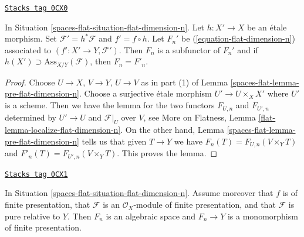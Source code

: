 \begin{lemma}
\label{spaces-flat-lemma-localize-flat-dimension-n}
\href{https://stacks.math.columbia.edu/tag/0CX0}{\texttt{Stacks tag 0CX0}}

In Situation \ref{spaces-flat-situation-flat-dimension-n}.
Let $h : X' \to X$ be an \'etale morphism.
Set $\mathcal{F}' = h^*\mathcal{F}$ and $f' = f \circ h$.
Let $F_n'$ be (\ref{equation-flat-dimension-n})
associated to $(f' : X' \to Y, \mathcal{F}')$.
Then $F_n$ is a subfunctor of $F_n'$ and if
$h(X') \supset \text{Ass}_{X/Y}(\mathcal{F})$, then $F_n = F'_n$.
\end{lemma}

\begin{proof}
Choose $U \to X$, $V \to Y$, $U \to V$ as in part (1) of
Lemma \ref{spaces-flat-lemma-pre-flat-dimension-n}. Choose a surjective
\'etale morphism $U' \to U \times_X X'$ where $U'$ is a scheme.
Then we have the lemma for the two functors
$F_{U, n}$ and $F_{U', n}$ determined by $U' \to U$ and $\mathcal{F}|_U$
over $V$, see
More on Flatness, Lemma \ref{flat-lemma-localize-flat-dimension-n}.
On the other hand, Lemma \ref{spaces-flat-lemma-pre-flat-dimension-n}
tells us that given $T \to Y$ we have
$F_n(T) = F_{U, n}(V \times_Y T)$
and
$F'_n(T) = F_{U', n}(V \times_Y T)$.
This proves the lemma.
\end{proof}

\begin{theorem}
\label{spaces-flat-theorem-flat-dimension-n-representable}
\href{https://stacks.math.columbia.edu/tag/0CX1}{\texttt{Stacks tag 0CX1}}

In Situation \ref{spaces-flat-situation-flat-dimension-n}.
Assume moreover that $f$ is of finite presentation, that
$\mathcal{F}$ is an $\mathcal{O}_X$-module of finite presentation,
and that $\mathcal{F}$ is pure relative to $Y$.
Then $F_n$ is an algebraic space and
$F_n \to Y$ is a monomorphism of finite presentation.
\end{theorem}

